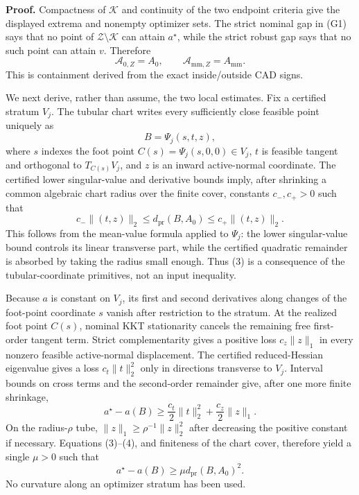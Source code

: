 \textbf{Proof.}
Compactness of \(\mathcal K\) and continuity of the two endpoint criteria give the displayed extrema and nonempty optimizer sets.  The strict nominal gap in (G1) says that no point of \(\mathcal Z\setminus\mathcal K\) can attain \(a^\star\), while the strict robust gap says that no such point can attain \(v\).  Therefore
\[
\mathcal A_{0,Z}=A_0,
\qquad
\mathcal A_{\mathrm{mm},Z}=A_{\mathrm{mm}}.
\tag{1}
\]
This is containment derived from the exact inside/outside CAD signs.

We next derive, rather than assume, the two local estimates.  Fix a certified stratum \(V_j\).  The tubular chart writes every sufficiently close feasible point uniquely as
\[
B=\Psi_j(s,t,z),
\tag{2}
\]
where \(s\) indexes the foot point \(C(s)=\Psi_j(s,0,0)\in V_j\), \(t\) is feasible tangent and orthogonal to \(T_{C(s)}V_j\), and \(z\) is an inward active-normal coordinate.  The certified lower singular-value and derivative bounds imply, after shrinking a common algebraic chart radius over the finite cover, constants \(c_-,c_+>0\) such that
\[
c_-\lVert(t,z)\rVert_2
\le d_{\mathrm{pr}}(B,A_0)
\le c_+\lVert(t,z)\rVert_2.
\tag{3}
\]
This follows from the mean-value formula applied to \(\Psi_j\): the lower singular-value bound controls its linear transverse part, while the certified quadratic remainder is absorbed by taking the radius small enough.  Thus (3) is a consequence of the tubular-coordinate primitives, not an input inequality.

Because \(a\) is constant on \(V_j\), its first and second derivatives along changes of the foot-point coordinate \(s\) vanish after restriction to the stratum.  At the realized foot point \(C(s)\), nominal KKT stationarity cancels the remaining free first-order tangent term.  Strict complementarity gives a positive loss \(c_z\lVert z\rVert_1\) in every nonzero feasible active-normal displacement.  The certified reduced-Hessian eigenvalue gives a loss \(c_t\lVert t\rVert_2^2\) only in directions transverse to \(V_j\).  Interval bounds on cross terms and the second-order remainder give, after one more finite shrinkage,
\[
a^\star-a(B)
\ge \frac{c_t}{2}\lVert t\rVert_2^2
+\frac{c_z}{2}\lVert z\rVert_1.
\tag{4}
\]
On the radius-\(\rho\) tube, \(\lVert z\rVert_1\ge\rho^{-1}\lVert z\rVert_2^2\) after decreasing the positive constant if necessary.  Equations (3)--(4), and finiteness of the chart cover, therefore yield a single \(\mu>0\) such that
\[
a^\star-a(B)\ge\mu d_{\mathrm{pr}}(B,A_0)^2.
\tag{5}
\]
No curvature along an optimizer stratum has been used.


